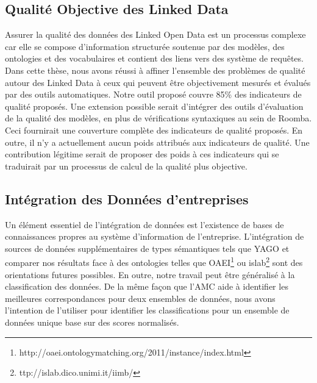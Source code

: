\subsection{Qualit\'{e} Objective des Linked Data}
Assurer la qualit\'{e} des donn\'{e}es des Linked Open Data est un processus complexe car elle se compose d'information structur\'{e}e soutenue par des mod\`{e}les, des ontologies et des vocabulaires et contient des liens vers des syst\`{e}me de requêtes. Dans cette th\`{e}se, nous avons r\'{e}ussi à affiner l'ensemble des probl\`{e}mes de qualit\'{e} autour des Linked Data à ceux qui peuvent être objectivement mesur\'{e}s et \'{e}valu\'{e}s par des outils automatiques. Notre outil propos\'{e} couvre 85\% des indicateurs de qualit\'{e} propos\'{e}s. Une extension possible serait d'int\'{e}grer des outils d'\'{e}valuation de la qualit\'{e} des mod\`{e}les, en plus de v\'{e}rifications syntaxiques au sein de Roomba. Ceci fournirait une couverture compl\`{e}te des indicateurs de qualit\'{e} propos\'{e}s. En outre, il n'y a actuellement aucun poids attribu\'{e}s aux indicateurs de qualit\'{e}. Une contribution l\'{e}gitime serait de proposer des poids à ces indicateurs qui se traduirait par un processus de calcul de la qualit\'{e} plus objective.

\subsection{Int\'{e}gration des Donn\'{e}es d'entreprises}
Un \'{e}l\'{e}ment essentiel de l'int\'{e}gration de donn\'{e}es est l'existence de bases de connaissances propres au syst\`{e}me d'information de l'entreprise. L'int\'{e}gration de sources de donn\'{e}es suppl\'{e}mentaires de types s\'{e}mantiques tels que YAGO et comparer nos r\'{e}sultats face à des ontologies telles que OAEI\footnote{http://oaei.ontologymatching.org/2011/instance/index.html} ou islab\footnote{ttp://islab.dico.unimi.it/iimb/} sont des orientations futures possibles. En outre, notre travail peut être g\'{e}n\'{e}ralis\'{e} à la classification des donn\'{e}es. De la même façon que l'AMC aide à identifier les meilleures correspondances pour deux ensembles de donn\'{e}es, nous avons l'intention de l'utiliser pour identifier les classifications pour un ensemble de donn\'{e}es unique base sur des scores normalis\'{e}s.